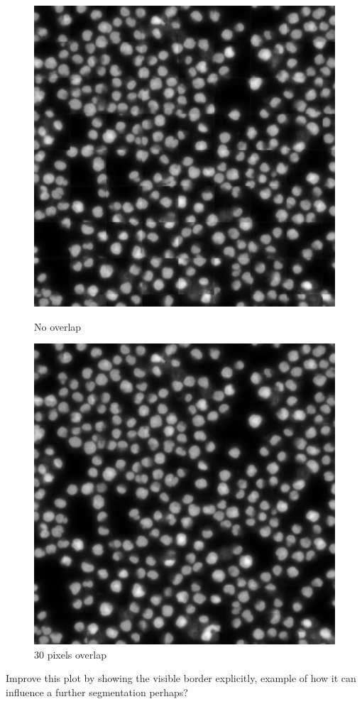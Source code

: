 \begin{figure}[htb]
    \centering
    \begin{minipage}{.48\textwidth}
      \centering
      \includegraphics[width=\linewidth]{bilder/crops_combination/prediction_border_0.png}
      \caption{No overlap}
      \label{fig:crops_combination_0}
    \end{minipage}%
    \vspace{1cm}
    \begin{minipage}{.48\textwidth}
      \centering
      \includegraphics[width=\linewidth]{bilder/crops_combination/prediction_border_34.png}
      \caption{30 pixels overlap}
      \label{fig:crops_combination_34}
    \end{minipage}
\end{figure}


Improve this plot by showing the visible border explicitly, example of how it can influence a further segmentation perhaps?